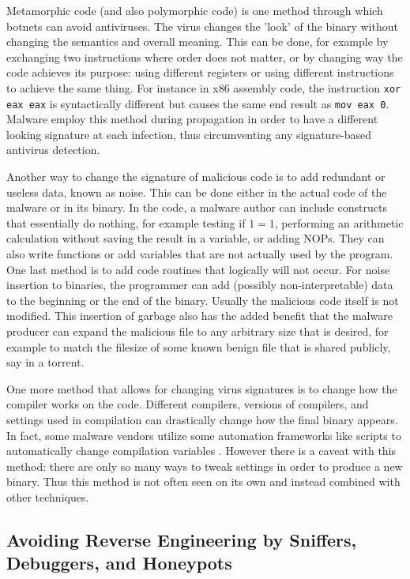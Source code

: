 \documentclass{acm_proc_article-sp}
\begin{document}
Metamorphic code (and also polymorphic code) is one method through which botnets can avoid antiviruses. The virus changes the 'look' of the binary without changing the semantics and overall meaning. This can be done, for example by exchanging two instructions where order does not matter, or by changing way the code achieves its purpose: using different registers or using different instructions to achieve the same thing. For instance in x86 assembly code, the instruction \texttt{xor eax eax} is syntactically different but causes the same end result as \texttt{mov eax 0}. Malware employ this method during propagation in order to have a different looking signature at each infection, thus circumventing any signature-based antivirus detection.

Another way to change the signature of malicious code is to add redundant or useless data, known as noise. This can be done either in the actual code of the malware or in its binary. In the code, a malware author can include constructs that essentially do nothing, for example testing if $1=1$, performing an arithmetic calculation without saving the result in a variable, or adding NOPs. They can also write functions or add variables that are not actually used by the program. One last method is to add code routines that logically will not occur. For noise insertion to binaries, the programmer can add (possibly non-interpretable) data to the beginning or the end of the binary. Usually the malicious code itself is not modified. This insertion of garbage also has the added benefit that the malware producer can expand the malicious file to any arbitrary size that is desired, for example to match the filesize of some known benign file that is shared publicly, say in a torrent.

One more method that allows for changing virus signatures is to change how the compiler works on the code. Different compilers, versions of compilers, and settings used in compilation can drastically change how the final binary appears. In fact, some malware vendors utilize some automation frameworks like scripts to automatically change compilation variables \cite{ollmann:evasion}. However there is a caveat with this method: there are only so many ways to tweak settings in order to produce a new binary. Thus this method is not often seen on its own and instead combined with other techniques.


\subsection{Avoiding Reverse Engineering by Sniffers, Debuggers, and Honeypots}
\end{document}
